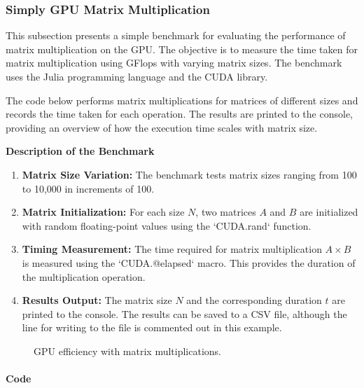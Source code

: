 \subsubsection{Simply GPU Matrix Multiplication}

This subsection presents a simple benchmark for evaluating the performance of matrix multiplication on the GPU. The objective is to measure the time taken for matrix multiplication using GFlops with varying matrix sizes. The benchmark uses the Julia programming language and the CUDA library.

The code below performs matrix multiplications for matrices of different sizes and records the time taken for each operation. The results are printed to the console, providing an overview of how the execution time scales with matrix size.

\begin{center}
   \textbf{Description of the Benchmark}   
\end{center}

\begin{enumerate}
   \item \textbf{Matrix Size Variation:} The benchmark tests matrix sizes ranging from 100 to 10,000 in increments of 100.
   \item \textbf{Matrix Initialization:} For each size \(N\), two matrices \(A\) and \(B\) are initialized with random floating-point values using the `CUDA.rand` function.
   \item  \textbf{Timing Measurement:} The time required for matrix multiplication \(A \times B\) is measured using the `CUDA.@elapsed` macro. This provides the duration of the multiplication operation.
   \item  \textbf{Results Output:} The matrix size \(N\) and the corresponding duration \(t\) are printed to the console. The results can be saved to a CSV file, although the line for writing to the file is commented out in this example.
\end{enumerate}

\begin{figure}[h]
    \begin{center}
        
   \end{center}
   \caption{GPU efficiency with matrix multiplications.}
   \label{}
\end{figure}

\paragraph{Code}

